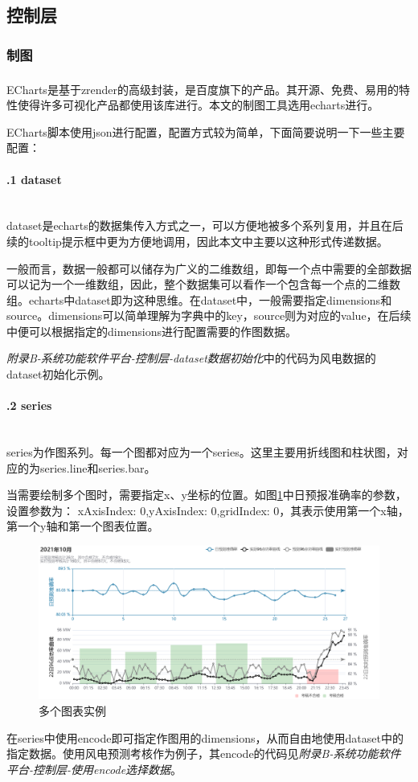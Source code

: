 \documentclass[winfonts,UTF8,a4paper]{ctexart}
\newcommand{\upcite}[1]{\textsuperscript{\textsuperscript{\cite{#1}}}}
\begin{document}
\subsection{控制层}
\subsubsection{制图}\label{zhitu}


ECharts是基于zrender的高级封装\upcite{li2018echarts}，是百度旗下的产品。其开源、免费、易用的特性使得许多可视化产品都使用该库进行。本文的制图工具选用echarts进行。

ECharts脚本使用json进行配置，配置方式较为简单，下面简要说明一下一些主要配置：
\paragraph{\thesubsubsection.1 dataset}\ \\

dataset是echarts的数据集传入方式之一，可以方便地被多个系列复用，并且在后续的tooltip提示框中更为方便地调用，因此本文中主要以这种形式传递数据。

一般而言，数据一般都可以储存为广义的二维数组，即每一个点中需要的全部数据可以记为一个一维数组，因此，整个数据集可以看作一个包含每一个点的二维数组。echarts中dataset即为这种思维。在dataset中，一般需要指定dimensions和source。dimensions可以简单理解为字典中的key，source则为对应的value，在后续中便可以根据指定的dimensions进行配置需要的作图数据。

\textit{附录B-系统功能软件平台-控制层-dataset数据初始化}中的代码为风电数据的dataset初始化示例。


\paragraph{\thesubsubsection.2 series}\label{xAxisIndexyAxisIndex}\ \\

series为作图系列。每一个图都对应为一个series。这里主要用折线图和柱状图，对应的为series.line和series.bar。


当需要绘制多个图时，需要指定x、y坐标的位置。如图\ref{fig:screenshot002}中日预报准确率的参数，设置参数为：	xAxisIndex: 0,yAxisIndex: 0,gridIndex: 0，其表示使用第一个x轴，第一个y轴和第一个图表位置。
\begin{figure}[H]
	\centering
	\includegraphics[width=0.8\linewidth]{pic/screenshot002}
	\caption{多个图表实例}
	\label{fig:screenshot002}
\end{figure}
在series中使用encode即可指定作图用的dimensions，从而自由地使用dataset中的指定数据。使用风电预测考核作为例子，其encode的代码见\textit{附录B-系统功能软件平台-控制层-使用encode选择数据}。
\end{document}
